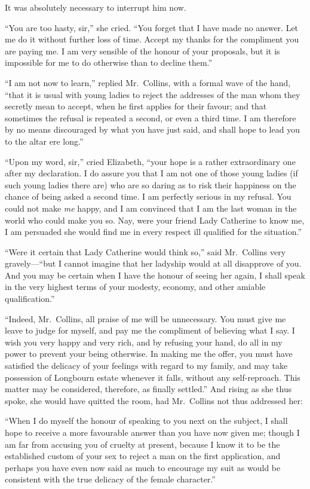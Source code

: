 \documentclass[12pt,english]{book}
\begin{document}
It was absolutely necessary to interrupt him now.

{}``You are too hasty, sir,'' she cried. {}``You forget that I
have made no answer. Let me do it without further loss of time. Accept
my thanks for the compliment you are paying me. I am very sensible
of the honour of your proposals, but it is impossible for me to do
otherwise than to decline them.''

{}``I am not now to learn,'' replied Mr.\ Collins, with a formal
wave of the hand, {}``that it is usual with young ladies to reject
the addresses of the man whom they secretly mean to accept, when he
first applies for their favour; and that sometimes the refusal is
repeated a second, or even a third time. I am therefore by no means
discouraged by what you have just said, and shall hope to lead you
to the altar ere long.''

{}``Upon my word, sir,'' cried Elizabeth, {}``your hope is a rather
extraordinary one after my declaration. I do assure you that I am
not one of those young ladies (if such young ladies there are) who
are so daring as to risk their happiness on the chance of being asked
a second time. I am perfectly serious in my refusal. You could not
make \textit{me} happy, and I am convinced that I am the last woman
in the world who could make you so. Nay, were your friend Lady Catherine
to know me, I am persuaded she would find me in every respect ill
qualified for the situation.''

{}``Were it certain that Lady Catherine would think so,'' said Mr.\ Collins
very gravely\mbox{---}{}``but I cannot imagine that her ladyship
would at all disapprove of you. And you may be certain when I have
the honour of seeing her again, I shall speak in the very highest
terms of your modesty, economy, and other amiable qualification.''

{}``Indeed, Mr.\ Collins, all praise of me will be unnecessary.
You must give me leave to judge for myself, and pay me the compliment
of believing what I say. I wish you very happy and very rich, and
by refusing your hand, do all in my power to prevent your being otherwise.
In making me the offer, you must have satisfied the delicacy of your
feelings with regard to my family, and may take possession of Longbourn
estate whenever it falls, without any self-reproach. This matter may
be considered, therefore, as finally settled.'' And rising as she
thus spoke, she would have quitted the room, had Mr.\ Collins not
thus addressed her:

{}``When I do myself the honour of speaking to you next on the subject,
I shall hope to receive a more favourable answer than you have now
given me; though I am far from accusing you of cruelty at present,
because I know it to be the established custom of your sex to reject
a man on the first application, and perhaps you have even now said
as much to encourage my suit as would be consistent with the true
delicacy of the female character.''
\end{document}
